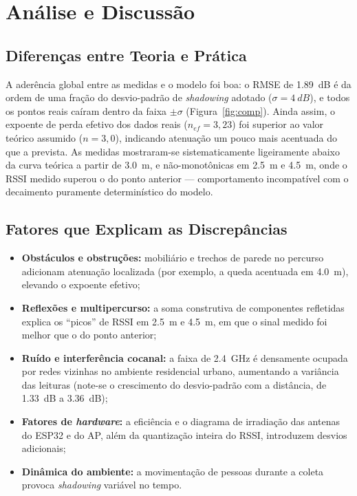 \documentclass[
  12pt,
  a4paper,
  oneside,
  brazil,
  chapter=TITLE,
  section=TITLE,
]{abntex2}
\begin{document}
\chapter{An\'alise e Discuss\~ao}

\section{Diferen\c{c}as entre Teoria e Pr\'atica}

A ader\^encia global entre as medidas e o modelo foi boa: o RMSE de
\SI{1.89}{dB} \'e da ordem de uma fra\c{c}\~ao do desvio-padr\~ao de
\textit{shadowing} adotado ($\sigma = \SI{4}{dB}$), e todos os pontos reais
ca\'iram dentro da faixa $\pm\sigma$ (Figura~\ref{fig:comp}). Ainda assim, o
expoente de perda efetivo dos dados reais ($n_{ef} = 3{,}23$) foi superior ao
valor te\'orico assumido ($n = 3{,}0$), indicando atenua\c{c}\~ao um pouco mais
acentuada do que a prevista. As medidas mostraram-se sistematicamente
ligeiramente abaixo da curva te\'orica a partir de \SI{3.0}{\meter}, e
n\~ao-monot\^onicas em \SI{2.5}{\meter} e \SI{4.5}{\meter}, onde o RSSI medido
superou o do ponto anterior --- comportamento incompat\'ivel com o decaimento
puramente determin\'istico do modelo.

\section{Fatores que Explicam as Discrep\^ancias}

\begin{itemize}
  \item \textbf{Obst\'aculos e obstru\c{c}\~oes:} mobili\'ario e trechos de
        parede no percurso adicionam atenua\c{c}\~ao localizada (por exemplo, a
        queda acentuada em \SI{4.0}{\meter}), elevando o expoente efetivo;
  \item \textbf{Reflex\~oes e multipercurso:} a soma construtiva de componentes
        refletidas explica os ``picos'' de RSSI em \SI{2.5}{\meter} e
        \SI{4.5}{\meter}, em que o sinal medido foi melhor que o do ponto
        anterior;
  \item \textbf{Ru\'ido e interfer\^encia cocanal:} a faixa de
        \SI{2.4}{\giga\hertz} \'e densamente ocupada por redes vizinhas no
        ambiente residencial urbano, aumentando a vari\^ancia das leituras
        (note-se o crescimento do desvio-padr\~ao com a dist\^ancia,
        de \SI{1.33}{dB} a \SI{3.36}{dB});
  \item \textbf{Fatores de \textit{hardware}:} a efici\^encia e o diagrama de
        irradia\c{c}\~ao das antenas do ESP32 e do AP, al\'em da quantiza\c{c}\~ao
        inteira do RSSI, introduzem desvios adicionais;
  \item \textbf{Din\^amica do ambiente:} a movimenta\c{c}\~ao de pessoas durante
        a coleta provoca \textit{shadowing} vari\'avel no tempo.
\end{itemize}
\end{document}
